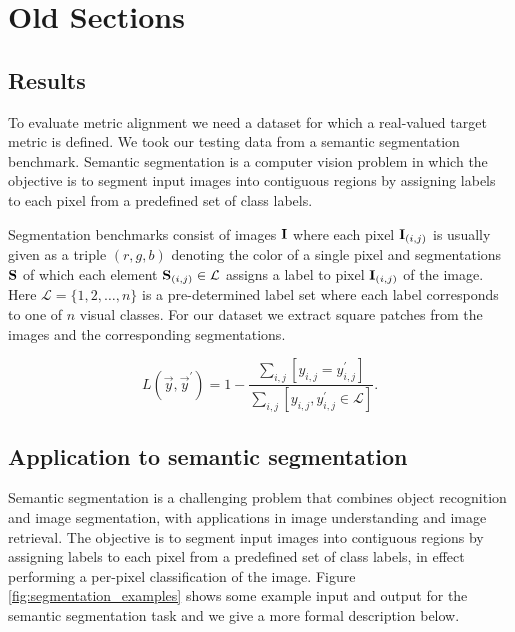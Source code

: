 \newpage

\chapter*{Old Sections}


\section{Results}

To evaluate metric alignment we need a dataset for which a real-valued target metric is defined. We took our testing data from a semantic segmentation benchmark. Semantic segmentation is a computer vision problem in which the objective is to segment input images into contiguous regions by assigning labels to each pixel from a predefined set of class labels. 


Segmentation benchmarks consist of images $\mathbf{I}$ where each pixel $\mathbf{I}_{(i,j)}$ is usually given as a triple $(r,g,b)$ denoting the color of a single pixel and segmentations $\mathbf{S}$ of which each element  $\mathbf{S}_{(i,j)} \in \mathcal{L}$ assigns a label to pixel $\mathbf{I}_{(i,j)}$ of the image. Here $\mathcal{L} = \{1, 2, \ldots, n\}$ is a pre-determined label set  where each label corresponds to one of $n$ visual classes. For our dataset we extract square patches from the images and the corresponding segmentations.


\begin{equation}
L(\vec{y}, \vec{y}^\prime) = 1 - \frac{\sum_{i,j} \left [ y_{i,j} = y^\prime_{i,j}\right]}{\sum_{i,j} \left [y_{i,j}, y^\prime_{i,j} \in \mathcal{L}\right ]}.
\label{eq:patch_loss}
\end{equation}



\section{Application to semantic segmentation}





Semantic segmentation is a challenging problem that combines object recognition and image segmentation, with applications in image understanding and image retrieval. The objective is to segment input images into contiguous regions by assigning labels to each pixel from a predefined set of class labels, in effect performing a per-pixel classification of the image. Figure \ref{fig:segmentation_examples} shows some example input and output for the semantic segmentation task and we give a more formal description below.



